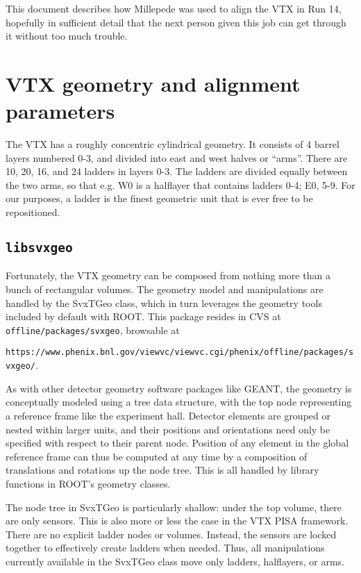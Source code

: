 \documentclass{article}
\begin{document}
This document describes how Millepede was used to align the VTX in Run 14, hopefully in sufficient detail that the next person given this job can get through it without too much trouble.

\section{VTX geometry and alignment parameters}
The VTX has a roughly concentric cylindrical geometry. It consists of 4 barrel layers numbered 0-3, and divided into east and west halves or ``arms''. There are 10, 20, 16, and 24 ladders in layers 0-3. The ladders are divided equally between the two arms, so that e.g. W0 is a halflayer that contains ladders 0-4; E0, 5-9. For our purposes, a ladder is the finest geometric unit that is ever free to be repositioned.

\subsection{\texttt{libsvxgeo}}
Fortunately, the VTX geometry can be composed from nothing more than a bunch of rectangular volumes. The geometry model and manipulations are handled by the SvxTGeo class, which in turn leverages the geometry tools included by default with ROOT. This package resides in CVS at \texttt{offline/packages/svxgeo}, browsable at

\medskip
\verb|https://www.phenix.bnl.gov/viewvc/viewvc.cgi/phenix/offline/packages/svxgeo/|.

\medskip
As with other detector geometry software packages like GEANT, the geometry is conceptually modeled using a tree data structure, with the top node representing a reference frame like the experiment hall. Detector elements are grouped or nested within larger units, and their positions and orientations need only be specified with respect to their parent node. Position of any element in the global reference frame can thus be computed at any time by a composition of translations and rotations up the node tree. This is all handled by library functions in ROOT's geometry classes.

The node tree in SvxTGeo is particularly shallow: under the top volume, there are only sensors. This is also more or less the case in the VTX PISA framework.
There are no explicit ladder nodes or volumes. Instead, the sensors are locked together to effectively create ladders when needed. Thus, all manipulations currently available in the SvxTGeo class move only ladders, halflayers, or arms.
\end{document}
